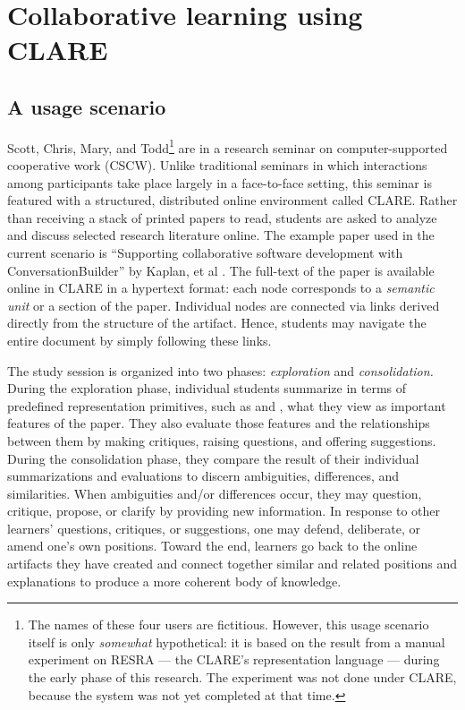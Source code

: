 \section{Collaborative learning using CLARE}
\label{sec:example}

\subsection{A usage scenario}

Scott, Chris, Mary, and Todd\footnote{The names of these four users are
fictitious. However, this usage scenario itself is only {\it somewhat\/}
hypothetical: it is based on the result from a manual experiment on RESRA
--- the CLARE's representation language --- during the early phase of this
research. The experiment was not done under CLARE, because the system was
not yet completed at that time.} are in a research seminar on
computer-supported cooperative work (CSCW). Unlike traditional seminars in
which interactions among participants take place largely in a face-to-face
setting, this seminar is featured with a structured, distributed online
environment called CLARE. Rather than receiving a stack of printed papers
to read, students are asked to analyze and discuss selected research
literature online. The example paper used in the current scenario is
``Supporting collaborative software development with ConversationBuilder''
by Kaplan, et al \cite{Kaplan92}. The full-text of the paper is available
online in CLARE in a hypertext format: each node corresponds to a {\it
semantic unit\/} or a section of the paper. Individual nodes are connected
via links derived directly from the structure of the artifact. Hence,
students may navigate the entire document by simply following these links.

The study session is organized into two phases: {\it exploration\/} and
{\it consolidation\/.} During the exploration phase, individual students
summarize in terms of predefined representation primitives, such as
 and , what they view as important
features of the paper. They also evaluate those features and the
relationships between them by making critiques, raising questions, and
offering suggestions. During the consolidation phase, they compare the
result of their individual summarizations and evaluations to discern
ambiguities, differences, and similarities. When ambiguities and/or
differences occur, they may question, critique, propose, or clarify by
providing new information. In response to other learners' questions,
critiques, or suggestions, one may defend, deliberate, or amend one's own
positions. Toward the end, learners go back to the online artifacts they
have created and connect together similar and related positions and
explanations to produce a more coherent body of knowledge.

